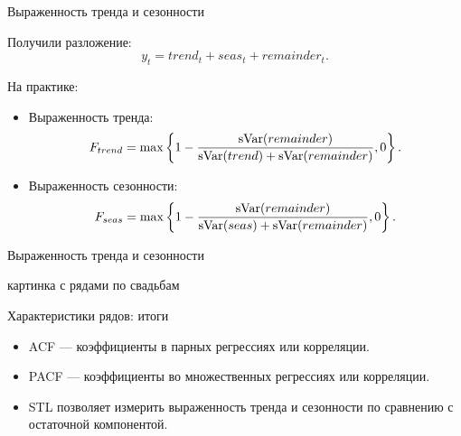   \begin{frame}{Выраженность тренда и сезонности}

    Получили разложение:
    \[
      y_t = trend_t + seas_t + remainder_t.
    \]

    \pause
    \alert{На практике}:
    \begin{itemize}[<+->]
      \item Выраженность тренда:
      \[
        F_{trend} = \max\left\{1 - \frac{\operatorname{sVar}(remainder)}{\operatorname{sVar}(trend) + \operatorname{sVar}(remainder)}, 0 \right\}.
      \]
      \item Выраженность сезонности:
      \[
        F_{seas} = \max\left\{1 - \frac{\operatorname{sVar}(remainder)}{\operatorname{sVar}(seas) + \operatorname{sVar}(remainder)}, 0 \right\}.
      \]

    \end{itemize}



  \end{frame}


  \begin{frame}{Выраженность тренда и сезонности}

    картинка с рядами по свадьбам
    
  \end{frame}
  


\begin{frame}{Характеристики рядов: итоги}

  \begin{itemize}[<+->]
    \item ACF — коэффициенты в \alert{парных} регрессиях или корреляции.
    \item PACF — коэффициенты во \alert{множественных} регрессиях или корреляции.
    \item STL позволяет измерить \alert{выраженность тренда и сезонности} по сравнению с остаточной компонентой.
  \end{itemize}
\end{frame}

